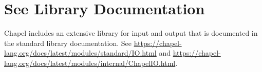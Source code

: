 \label{Input_and_Output}

\section{See Library Documentation}

Chapel includes an extensive library for input and output that is
documented in the standard library documentation. See
\url{https://chapel-lang.org/docs/latest/modules/standard/IO.html}
and
\url{https://chapel-lang.org/docs/latest/modules/internal/ChapelIO.html}.

